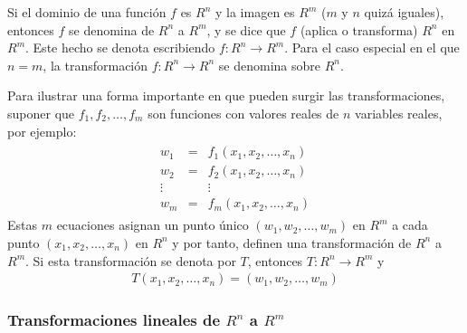 \documentclass[a4paper,12pt]{article}
\begin{document}
Si el dominio de una función $f$ es $R^n$ y la imagen es $R^m$ ($m$ y
$n$ quizá iguales), entonces $f$ se denomina  de $R^n$ a
$R^m$, y se dice que $f$  (aplica o transforma) $R^n$ en $R^m$. Este
hecho se denota escribiendo $f:R^n\rightarrow R^m$. Para el caso especial en
el que $n=m$, la transformación $f:R^n\rightarrow R^n$ se denomina
 sobre $R^n$.

Para ilustrar una forma importante en que pueden surgir las transformaciones,
suponer que $f_1, f_2, \ldots, f_m$ son funciones con valores reales de
$n$ variables reales, por ejemplo:
\begin{align}
  \begin{matrix}
    w_1&=&f_1(x_1,x_2,\ldots,x_n)\\
    w_2&=&f_2(x_1,x_2,\ldots,x_n)\\
    \vdots& &\vdots \\
    w_m&=&f_m(x_1,x_2,\ldots,x_n)
  \end{matrix}
  \label{eqn:transf_rnrm}
\end{align}
Estas $m$ ecuaciones asignan un punto único $(w_1,w_2,\ldots,w_m)$ en
$R^m$ a cada punto $(x_1,x_2,\ldots,x_n)$ en $R^n$ y por tanto, definen una
transformación de $R^n$ a $R^m$. Si esta transformación se denota por
$T$, entonces $T:R^n\rightarrow R^m$ y
\begin{align*}
  T(x_1,x_2,\ldots,x_n)=(w_1,w_2,\ldots,w_m)
\end{align*}
 
\subsubsection{Transformaciones lineales de $R^n$ a $R^m$}
\end{document}
